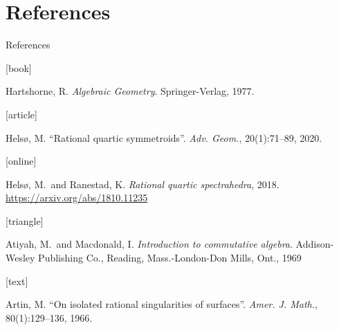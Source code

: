 \documentclass[UKenglish]{beamer}
\begin{document}
\section{References}


\begin{frame}[allowframebreaks]{References}
    \begin{thebibliography}{}

        [book]

        Hartshorne, R.
        \newblock \emph{Algebraic Geometry}.
        \newblock Springer-Verlag, 1977.

        [article]

        Helsø, M.
        \newblock \enquote{Rational quartic symmetroids}.
        \newblock \emph{Adv. Geom.}, 20(1):71--89, 2020.

        [online]

        Helsø, M.\ and Ranestad, K.
        \newblock \emph{Rational quartic spectrahedra}, 2018.
        \newblock \url{https://arxiv.org/abs/1810.11235}

        [triangle]

        Atiyah, M.\ and Macdonald, I.
        \newblock \emph{Introduction to commutative algebra}.
        \newblock Addison-Wesley Publishing Co., Reading, Mass.-London-Don
        Mills, Ont., 1969

        [text]

        Artin, M.
        \newblock \enquote{On isolated rational singularities of surfaces}.
        \newblock \emph{Amer. J. Math.}, 80(1):129--136, 1966.

    \end{thebibliography}
\end{frame}
\end{document}
